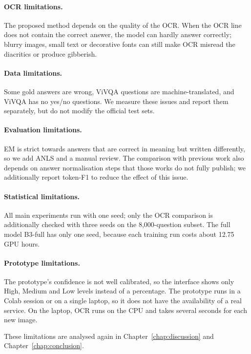 \paragraph{OCR limitations.} The proposed method depends on the quality of the OCR.
When the OCR line does not contain the correct answer, the model can hardly answer
correctly; blurry images, small text or decorative fonts can still make OCR misread
the diacritics or produce gibberish.

\paragraph{Data limitations.} Some gold answers are wrong, ViVQA questions are
machine-translated, and ViVQA has no yes/no questions. We measure these issues
and report them separately, but do not modify the official test sets.

\paragraph{Evaluation limitations.} EM is strict towards answers that are correct in
meaning but written differently, so we add ANLS and a manual review. The
comparison with previous work also depends on answer normalisation steps that those
works do not fully publish; we additionally report token-F1 to reduce the
effect of this issue.

\paragraph{Statistical limitations.} All main experiments run with one seed; only the
OCR comparison is additionally checked with three seeds on the 8,000-question
subset. The full model B3-full has only one seed, because each training run costs
about 12.75 GPU hours.

\paragraph{Prototype limitations.} The prototype's confidence is not well calibrated,
so the interface shows only High, Medium and Low levels instead of a percentage. The
prototype runs in a Colab session or on a single laptop, so it does not have the
availability of a real service. On the laptop, OCR runs on the CPU and takes several
seconds for each new image.

These limitations are analysed again in Chapter~\ref{chap:discussion} and
Chapter~\ref{chap:conclusion}.

